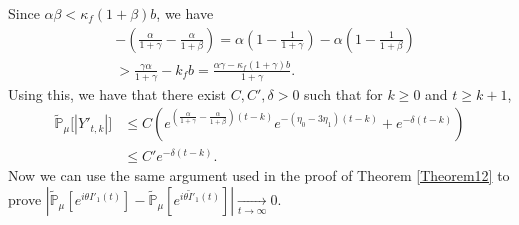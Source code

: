 \documentclass[12pt,a4paper]{amsart}
\theoremstyle{plain}
\theoremstyle{definition}
\numberwithin{equation}{section}
\begin{document}
Since $\alpha\beta<\kappa_f(1+\beta)b$,  we have
\begin{equation}\begin{split}
\label{eq: condition for supercritical}
	&-(\frac{\alpha}{1+\gamma}-\frac{\alpha}{1+\beta})
    = \alpha(1-\frac{1}{1+\gamma}) - \alpha(1-\frac{1}{1+\beta})
    \\&> \frac{\gamma \alpha}{1+\gamma} - k_f b
    =\frac{\alpha \gamma-\kappa_f(1+\gamma)b}{1+\gamma}.
\end{split}\end{equation}
	Using this, we have that there exist $C,C',
    \delta > 0$ such that for $k\geq 0$ and $t\geq k+1$,
\begin{align*}
    \mathbb{\tilde{P}}_{\mu}\big[|Y'_{t,k}|\big]
    & \leq C( e^{(\frac{\alpha}{1+\gamma} - \frac{\alpha}{1+\beta})(t-k)}e^{-(\eta_0 - 3\eta_1)(t-k)}+ e^{-\delta(t-k)})
    \\& \leq C'e^{-\delta (t-k)}.
\end{align*}
Now we can  use the  same argument used in the proof of Theorem \ref{Theorem12}
to prove $|\mathbb{\tilde{P}}_{\mu}[e^{i\theta I'_1(t)}]-\mathbb{\tilde{P}}_{\mu}[e^{i\theta\tilde I'_1(t)}]|\xrightarrow[t\to \infty]{} 0$.
\end{document}
